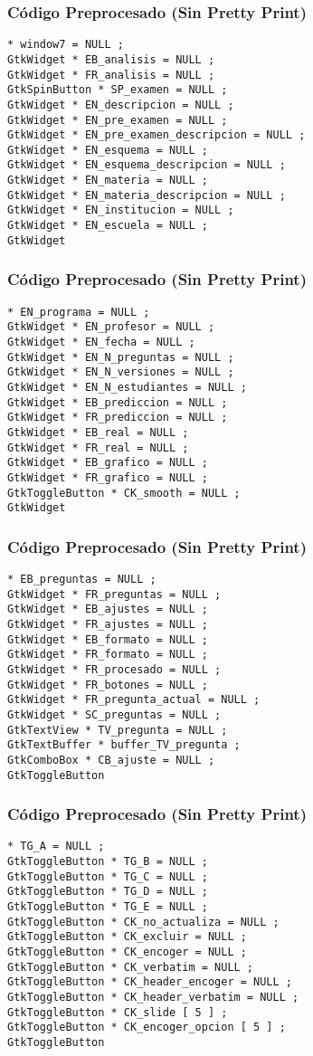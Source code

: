\documentclass{beamer}
\begin{document}
\begin{frame}[fragile]
\frametitle{C\'odigo Preprocesado (Sin Pretty Print)}
\begin{lstlisting}[style=CStyle]
* window7 = NULL ; 
GtkWidget * EB_analisis = NULL ; 
GtkWidget * FR_analisis = NULL ; 
GtkSpinButton * SP_examen = NULL ; 
GtkWidget * EN_descripcion = NULL ; 
GtkWidget * EN_pre_examen = NULL ; 
GtkWidget * EN_pre_examen_descripcion = NULL ; 
GtkWidget * EN_esquema = NULL ; 
GtkWidget * EN_esquema_descripcion = NULL ; 
GtkWidget * EN_materia = NULL ; 
GtkWidget * EN_materia_descripcion = NULL ; 
GtkWidget * EN_institucion = NULL ; 
GtkWidget * EN_escuela = NULL ; 
GtkWidget \end{lstlisting}
\end{frame}
\begin{frame}[fragile]
\frametitle{C\'odigo Preprocesado (Sin Pretty Print)}
\begin{lstlisting}[style=CStyle]
* EN_programa = NULL ; 
GtkWidget * EN_profesor = NULL ; 
GtkWidget * EN_fecha = NULL ; 
GtkWidget * EN_N_preguntas = NULL ; 
GtkWidget * EN_N_versiones = NULL ; 
GtkWidget * EN_N_estudiantes = NULL ; 
GtkWidget * EB_prediccion = NULL ; 
GtkWidget * FR_prediccion = NULL ; 
GtkWidget * EB_real = NULL ; 
GtkWidget * FR_real = NULL ; 
GtkWidget * EB_grafico = NULL ; 
GtkWidget * FR_grafico = NULL ; 
GtkToggleButton * CK_smooth = NULL ; 
GtkWidget \end{lstlisting}
\end{frame}
\begin{frame}[fragile]
\frametitle{C\'odigo Preprocesado (Sin Pretty Print)}
\begin{lstlisting}[style=CStyle]
* EB_preguntas = NULL ; 
GtkWidget * FR_preguntas = NULL ; 
GtkWidget * EB_ajustes = NULL ; 
GtkWidget * FR_ajustes = NULL ; 
GtkWidget * EB_formato = NULL ; 
GtkWidget * FR_formato = NULL ; 
GtkWidget * FR_procesado = NULL ; 
GtkWidget * FR_botones = NULL ; 
GtkWidget * FR_pregunta_actual = NULL ; 
GtkWidget * SC_preguntas = NULL ; 
GtkTextView * TV_pregunta = NULL ; 
GtkTextBuffer * buffer_TV_pregunta ; 
GtkComboBox * CB_ajuste = NULL ; 
GtkToggleButton \end{lstlisting}
\end{frame}
\begin{frame}[fragile]
\frametitle{C\'odigo Preprocesado (Sin Pretty Print)}
\begin{lstlisting}[style=CStyle]
* TG_A = NULL ; 
GtkToggleButton * TG_B = NULL ; 
GtkToggleButton * TG_C = NULL ; 
GtkToggleButton * TG_D = NULL ; 
GtkToggleButton * TG_E = NULL ; 
GtkToggleButton * CK_no_actualiza = NULL ; 
GtkToggleButton * CK_excluir = NULL ; 
GtkToggleButton * CK_encoger = NULL ; 
GtkToggleButton * CK_verbatim = NULL ; 
GtkToggleButton * CK_header_encoger = NULL ; 
GtkToggleButton * CK_header_verbatim = NULL ; 
GtkToggleButton * CK_slide [ 5 ] ; 
GtkToggleButton * CK_encoger_opcion [ 5 ] ; 
GtkToggleButton \end{lstlisting}
\end{frame}
\end{document}
